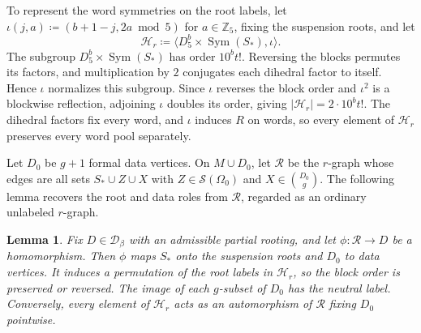 \documentclass[10pt]{article}
\numberwithin{equation}{section}
\newtheorem{lemma}[lemma]{Lemma}\aliascntresetthe{lemma}
\theoremstyle{definition}
\newcommand{\cD}{\mathcal D}\newcommand{\cE}{\mathcal E}\newcommand{\cF}{\mathcal F}
\begin{document}
To represent the word symmetries on the root labels, let $\iota(j,a)\coloneqq(b+1-j,2a\bmod5)$ for $a\in\mathbb Z_5$, fixing the suspension roots, and let
\[
 \mathscr H_r\coloneqq\langle D_5^b\times\operatorname{Sym}(S_*),\iota\rangle.
\]
The subgroup $D_5^b\times\operatorname{Sym}(S_*)$ has order $10^b t!$. Reversing the blocks permutes its factors, and multiplication by $2$ conjugates each dihedral factor to itself. Hence $\iota$ normalizes this subgroup. Since $\iota$ reverses the block order and $\iota^2$ is a blockwise reflection, adjoining $\iota$ doubles its order, giving $|\mathscr H_r|=2\cdot10^b t!$. The dihedral factors fix every word, and $\iota$ induces $R$ on words, so every element of $\mathscr H_r$ preserves every word pool separately.

Let $D_0$ be $g+1$ formal data vertices. On $M\cup D_0$, let $\mathscr R$ be the $r$-graph whose edges are all sets $S_*\cup Z\cup X$ with $Z\in\mathcal S(\Omega_0)$ and $X\in\binom{D_0}{g}$. The following lemma recovers the root and data roles from $\mathscr R$, regarded as an ordinary unlabeled $r$-graph.
\begin{lemma}\label{lem:rigidity}
Fix $D\in\cD_\beta$ with an admissible partial rooting, and let $\phi\colon\mathscr R\to D$ be a homomorphism. Then $\phi$ maps $S_*$ onto the suspension roots and $D_0$ to data vertices. It induces a permutation of the root labels in $\mathscr H_r$, so the block order is preserved or reversed. The image of each $g$-subset of $D_0$ has the neutral label. Conversely, every element of $\mathscr H_r$ acts as an automorphism of $\mathscr R$ fixing $D_0$ pointwise.
\end{lemma}
\end{document}
